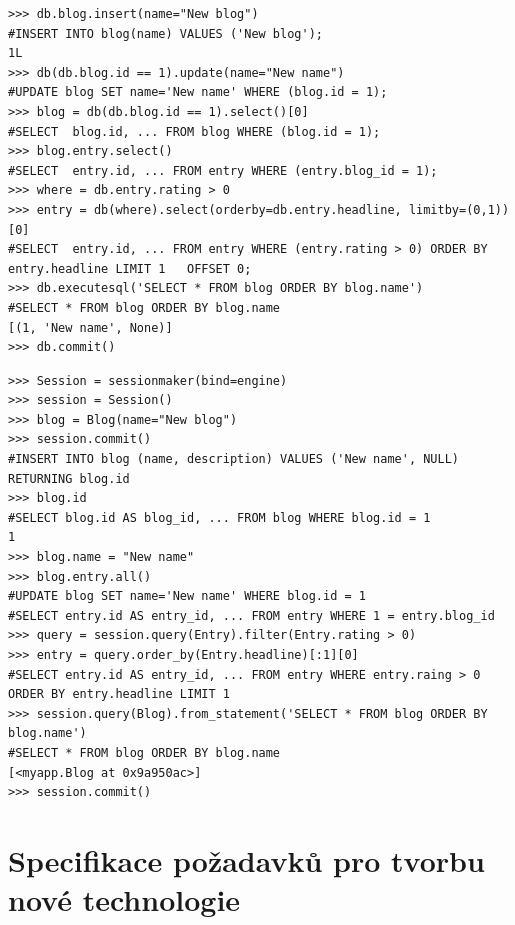 \documentclass[ing,male,java,dept456]{diploma}						%
\begin{document}
\begin{lstlisting}[style=custompython, label=src:w2p-query, caption={Ukázka práce s daty ve web2py DBAL}]
>>> db.blog.insert(name="New blog")
#INSERT INTO blog(name) VALUES ('New blog');
1L
>>> db(db.blog.id == 1).update(name="New name")
#UPDATE blog SET name='New name' WHERE (blog.id = 1);
>>> blog = db(db.blog.id == 1).select()[0]
#SELECT  blog.id, ... FROM blog WHERE (blog.id = 1);
>>> blog.entry.select()
#SELECT  entry.id, ... FROM entry WHERE (entry.blog_id = 1);
>>> where = db.entry.rating > 0
>>> entry = db(where).select(orderby=db.entry.headline, limitby=(0,1))[0]
#SELECT  entry.id, ... FROM entry WHERE (entry.rating > 0) ORDER BY entry.headline LIMIT 1   OFFSET 0; 
>>> db.executesql('SELECT * FROM blog ORDER BY blog.name')
#SELECT * FROM blog ORDER BY blog.name
[(1, 'New name', None)]
>>> db.commit()
\end{lstlisting}
\clearpage

\begin{lstlisting}[style=custompython, label=src:sqla-query, caption={Ukázka práce s daty v SQLAlchemy}]
>>> Session = sessionmaker(bind=engine)
>>> session = Session()
>>> blog = Blog(name="New blog")
>>> session.commit()
#INSERT INTO blog (name, description) VALUES ('New name', NULL) RETURNING blog.id
>>> blog.id
#SELECT blog.id AS blog_id, ... FROM blog WHERE blog.id = 1
1
>>> blog.name = "New name"
>>> blog.entry.all()
#UPDATE blog SET name='New name' WHERE blog.id = 1
#SELECT entry.id AS entry_id, ... FROM entry WHERE 1 = entry.blog_id
>>> query = session.query(Entry).filter(Entry.rating > 0)
>>> entry = query.order_by(Entry.headline)[:1][0]
#SELECT entry.id AS entry_id, ... FROM entry WHERE entry.raing > 0 ORDER BY entry.headline LIMIT 1
>>> session.query(Blog).from_statement('SELECT * FROM blog ORDER BY blog.name')
#SELECT * FROM blog ORDER BY blog.name
[<myapp.Blog at 0x9a950ac>]
>>> session.commit()
\end{lstlisting}

\section{Specifikace požadavků pro tvorbu nové technologie}
\label{sec:Design}
\end{document}
